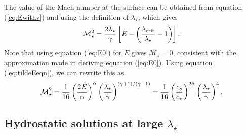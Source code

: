 \documentclass[preprint,12pt]{aastex}
\begin{document}
The value of the Mach number at the surface can be obtained from equation (\ref{eq:Ewithv}) and using the definition of $\lambda_\star$, which gives
\begin{equation}
\mathcal{M}_\star^2 = {2\lambda_\star\over \gamma}\left[\tilde{E} - \left(  {\lambda_\mathrm{crit}\over \lambda_\star}-1\right)\right].
\end{equation}
Note that using equation (\ref{eq:E0}) for $\tilde{E}$ gives $\mathcal{M}_\star=0$, consistent with the approximation made in deriving equation (\ref{eq:E0}). Using equation (\ref{eq:tildeEeqn}), we can rewrite this as
\begin{equation}
\mathcal{M}_\star^2 = {1\over 16}\left({2\tilde{E}\over\alpha}\right)^\alpha \left({\lambda_\star\over \gamma}\right)^{(\gamma+1)/(\gamma-1)} = {1\over 16}\left({c_s\over c_\star}\right)^{2\alpha} \left({\lambda_\star\over \gamma}\right)^4.
\end{equation}

\subsection{Hydrostatic solutions at large $\lambda_\star$}
\end{document}
